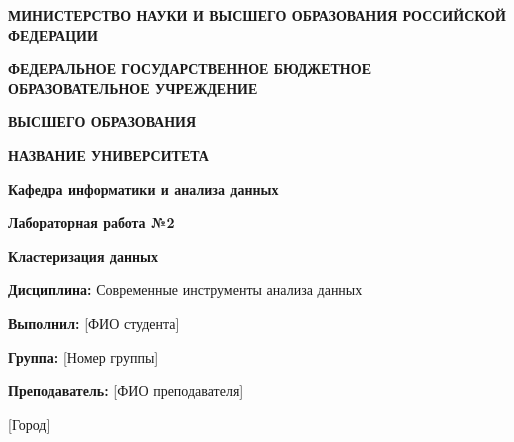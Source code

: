\documentclass[12pt,a4paper]{report}
\begin{document}
\begin{titlepage}
    \centering
    \vspace*{1cm}
    
    {\Large\textbf{МИНИСТЕРСТВО НАУКИ И ВЫСШЕГО ОБРАЗОВАНИЯ РОССИЙСКОЙ ФЕДЕРАЦИИ}\par}
    \vspace{0.5cm}
    
    {\large\textbf{ФЕДЕРАЛЬНОЕ ГОСУДАРСТВЕННОЕ БЮДЖЕТНОЕ ОБРАЗОВАТЕЛЬНОЕ УЧРЕЖДЕНИЕ}\par}
    \vspace{0.3cm}
    
    {\large\textbf{ВЫСШЕГО ОБРАЗОВАНИЯ}\par}
    \vspace{1cm}
    
    {\Large\textbf{НАЗВАНИЕ УНИВЕРСИТЕТА}\par}
    \vspace{0.5cm}
    
    {\large\textbf{Кафедра информатики и анализа данных}\par}
    \vspace{2cm}
    
    {\Huge\textbf{Лабораторная работа №2}\par}
    \vspace{0.5cm}
    
    {\LARGE\textbf{Кластеризация данных}\par}
    \vspace{1.5cm}
    
    \begin{flushleft}
    \large
    \textbf{Дисциплина:} Современные инструменты анализа данных\par
    \vspace{0.3cm}
    \textbf{Выполнил:} [ФИО студента]\par
    \vspace{0.3cm}
    \textbf{Группа:} [Номер группы]\par
    \vspace{0.3cm}
    \textbf{Преподаватель:} [ФИО преподавателя]\par
    \end{flushleft}
    
    \vfill
    
    {\large [Город] \the\year\par}
\end{titlepage}

\tableofcontents
\newpage
\end{document}

